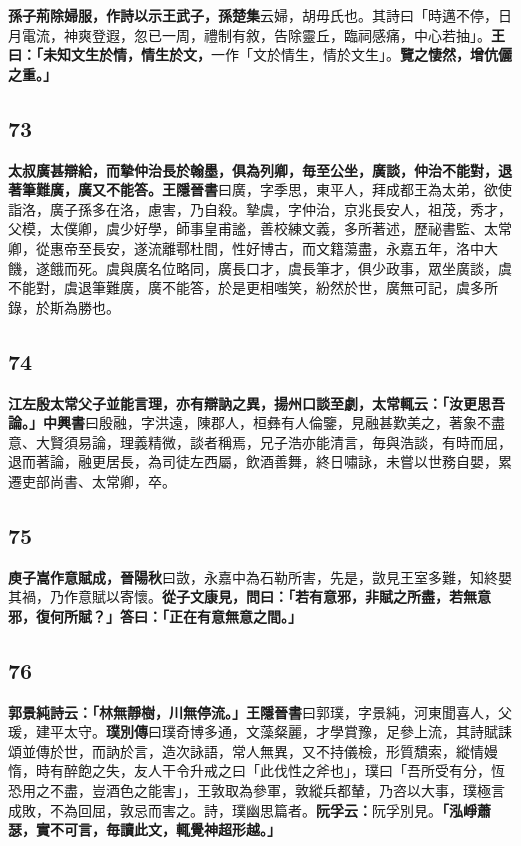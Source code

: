 \textbf{孫子荊除婦服，作詩以示王武子，}{\footnotesize \textbf{孫楚集}云婦，胡毋氏也。其詩曰「時邁不停，日月電流，神爽登遐，忽已一周，禮制有敘，告除靈丘，臨祠感痛，中心若抽」。}\textbf{王曰：「未知文生於情，情生於文，}{\footnotesize 一作「文於情生，情於文生」。}\textbf{覽之悽然，增伉儷之重。」}

\subsection*{73}

\textbf{太叔廣甚辯給，而摯仲治長於翰墨，俱為列卿，毎至公坐，廣談，仲治不能對，退著筆難廣，廣又不能答。}{\footnotesize \textbf{王隱晉書}曰廣，字季思，東平人，拜成都王為太弟，欲使詣洛，廣子孫多在洛，慮害，乃自殺。摯虞，字仲治，京兆長安人，祖茂，秀才，父模，太僕卿，虞少好學，師事皇甫謐，善校練文義，多所著述，歷祕書監、太常卿，從惠帝至長安，遂流離鄠杜間，性好博古，而文籍蕩盡，永嘉五年，洛中大饑，遂餓而死。虞與廣名位略同，廣長口才，虞長筆才，俱少政事，眾坐廣談，虞不能對，虞退筆難廣，廣不能答，於是更相嗤笑，紛然於世，廣無可記，虞多所錄，於斯為勝也。}

\subsection*{74}

\textbf{江左殷太常父子並能言理，亦有辯訥之異，揚州口談至劇，太常輒云：「汝更思吾論。」}{\footnotesize \textbf{中興書}曰殷融，字洪遠，陳郡人，桓彝有人倫鑒，見融甚歎美之，著象不盡意、大賢須易論，理義精微，談者稱焉，兄子浩亦能清言，毎與浩談，有時而屈，退而著論，融更居長，為司徒左西屬，飲酒善舞，終日嘯詠，未嘗以世務自嬰，累遷吏部尚書、太常卿，卒。}

\subsection*{75}

\textbf{庾子嵩作意賦成，}{\footnotesize \textbf{晉陽秋}曰敳，永嘉中為石勒所害，先是，敳見王室多難，知終嬰其禍，乃作意賦以寄懷。}\textbf{從子文康見，問曰：「若有意邪，非賦之所盡，若無意邪，復何所賦？」答曰：「正在有意無意之間。」}

\subsection*{76}

\textbf{郭景純詩云：「林無靜樹，川無停流。」}{\footnotesize \textbf{王隱晉書}曰郭璞，字景純，河東聞喜人，父瑗，建平太守。\textbf{璞別傳}曰璞奇博多通，文藻粲麗，才學賞豫，足參上流，其詩賦誄頌並傳於世，而訥於言，造次詠語，常人無異，又不持儀檢，形質穨索，縱情嫚惰，時有醉飽之失，友人干令升戒之曰「此伐性之斧也」，璞曰「吾所受有分，恆恐用之不盡，豈酒色之能害」，王敦取為參軍，敦縱兵都輦，乃咨以大事，璞極言成敗，不為回屈，敦忌而害之。詩，璞幽思篇者。}\textbf{阮孚云：}{\footnotesize 阮孚別見。}\textbf{「泓崢蕭瑟，實不可言，毎讀此文，輒覺神超形越。」}

